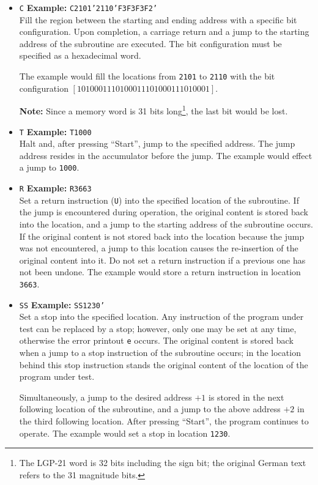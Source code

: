 \begin{itemize}
\item \texttt{C}
\textbf{Example:} \texttt{C2101'2110'F3F3F3F2'} \\
Fill the region between the starting and ending address with a specific bit configuration. Upon completion, a carriage return and a jump to the starting address of the subroutine are executed. The bit configuration must be specified as a hexadecimal word. 

The example would fill the locations from \texttt{2101} to \texttt{2110} with the bit configuration $[1010001110100011101000111010001]$.

\textbf{Note:} Since a memory word is 31 bits long\footnote{The LGP-21 word is 32 bits including the sign bit; the original German text refers to the 31 magnitude bits.}, the last bit would be lost.

\item \texttt{T}
\textbf{Example:} \texttt{T1000} \\
Halt and, after pressing ``Start'', jump to the specified address. The jump address resides in the accumulator before the jump. The example would effect a jump to \texttt{1000}.

\item \texttt{R}
\textbf{Example:} \texttt{R3663} \\
Set a return instruction (\texttt{U}) into the specified location of the subroutine. If the jump is encountered during operation, the original content is stored back into the location, and a jump to the starting address of the subroutine occurs. If the original content is not stored back into the location because the jump was not encountered, a jump to this location causes the re-insertion of the original content into it. Do not set a return instruction if a previous one has not been undone. The example would store a return instruction in location \texttt{3663}.

\item \texttt{SS}
\textbf{Example:} \texttt{SS1230'} \\
Set a stop into the specified location. Any instruction of the program under test can be replaced by a stop; however, only one may be set at any time, otherwise the error printout \texttt{e} occurs. The original content is stored back when a jump to a stop instruction of the subroutine occurs; in the location behind this stop instruction stands the original content of the location of the program under test.

Simultaneously, a jump to the desired address $+1$ is stored in the next following location of the subroutine, and a jump to the above address $+2$ in the third following location. After pressing ``Start'', the program continues to operate. The example would set a stop in location \texttt{1230}.


\end{itemize}
